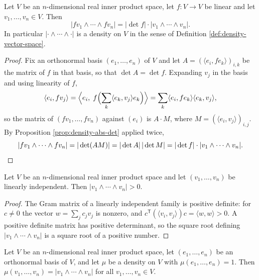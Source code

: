 \begin{proposition}
\label{prop:density-transformation-law}
\leanok
{}
Let $V$ be an $n$-dimensional real inner product space, let $f : V \to V$ be linear and let
$v_1, \ldots, v_n \in V$. Then
\[
|f v_1 \wedge \cdots \wedge f v_n| = |\det f| \cdot |v_1 \wedge \cdots \wedge v_n|.
\]
In particular $|{\cdot} \wedge \cdots \wedge {\cdot}|$ is a density on $V$ in the sense of
Definition \ref{def:density-vector-space}.
\end{proposition}

\begin{proof}
\leanok
{}
Fix an orthonormal basis $(e_1, \ldots, e_n)$ of $V$ and let $A = (\langle e_i, f e_k \rangle)_{i,k}$
be the matrix of $f$ in that basis, so that $\det A = \det f$. Expanding $v_j$ in the basis and
using linearity of $f$,
\[
\langle e_i, f v_j \rangle
= \Bigl\langle e_i, \; f \Bigl( \sum_k \langle e_k, v_j \rangle e_k \Bigr) \Bigr\rangle
= \sum_k \langle e_i, f e_k \rangle \langle e_k, v_j \rangle,
\]
so the matrix of $(f v_1, \ldots, f v_n)$ against $(e_i)$ is $A \cdot M$, where
$M = (\langle e_i, v_j \rangle)_{i,j}$. By Proposition \ref{prop:density-abs-det} applied twice,
\[
|f v_1 \wedge \cdots \wedge f v_n| = |\det(AM)| = |\det A| \, |\det M|
= |\det f| \cdot |v_1 \wedge \cdots \wedge v_n|. \qedhere
\]
\end{proof}

\begin{proposition}
\label{prop:density-positive}
\leanok
{}
Let $V$ be an $n$-dimensional real inner product space and let $(v_1, \ldots, v_n)$ be linearly
independent. Then $|v_1 \wedge \cdots \wedge v_n| > 0$.
\end{proposition}

\begin{proof}
\leanok
{}
The Gram matrix of a linearly independent family is positive definite: for $c \neq 0$ the vector
$w = \sum_j c_j v_j$ is nonzero, and $c^{\mathsf{T}} (\langle v_i, v_j \rangle) c = \langle w, w \rangle > 0$.
A positive definite matrix has positive determinant, so the square root defining
$|v_1 \wedge \cdots \wedge v_n|$ is a square root of a positive number.
\end{proof}

\begin{proposition}
\label{prop:density-uniqueness-pointwise}
\leanok
{}
Let $V$ be an $n$-dimensional real inner product space, let $(e_1, \ldots, e_n)$ be an orthonormal
basis of $V$, and let $\mu$ be a density on $V$ with $\mu(e_1, \ldots, e_n) = 1$. Then
$\mu(v_1, \ldots, v_n) = |v_1 \wedge \cdots \wedge v_n|$ for all $v_1, \ldots, v_n \in V$.
\end{proposition}

